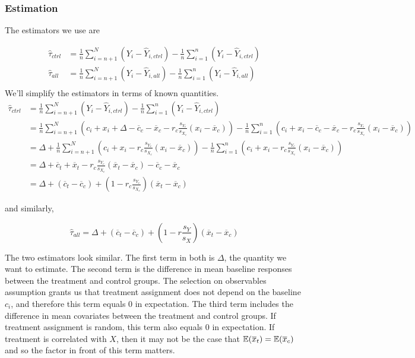 \subsubsection{Estimation}
The estimators we use are

\begin{align*}
\hat{\tau}_{ctrl} &= \frac{1}{n}\sum_{i = n+1}^N (Y_i - \hat{Y}_{i, ctrl}) - \frac{1}{n}\sum_{i=1}^n (Y_i - \hat{Y}_{i, ctrl} ) \nonumber \\
\hat{\tau}_{all} &= \frac{1}{n}\sum_{i = n+1}^N (Y_i - \hat{Y}_{i, all}) - \frac{1}{n}\sum_{i=1}^n (Y_i - \hat{Y}_{i, all} ) \nonumber \\
\end{align*}
We'll simplify the estimators in terms of known quantities.
\begin{align}
\hat{\tau}_{ctrl} &= \frac{1}{n}\sum_{i = n+1}^N (Y_i - \hat{Y}_{i, ctrl}) - \frac{1}{n}\sum_{i=1}^n (Y_i - \hat{Y}_{i, ctrl} ) \nonumber \\
&=  \frac{1}{n}\sum_{i = n+1}^N (c_i + x_i + \Delta - \overline{c}_c - \overline{x}_c - r_c \frac{s_{Y_c}}{s_{X_c}}(x_i - \overline{x}_c)) - \frac{1}{n}\sum_{i=1}^n (c_i + x_i - \overline{c}_c - \overline{x}_c - r_c \frac{s_{Y_c}}{s_{X_c}}(x_i - \overline{x}_c))  \nonumber \\
&= \Delta+  \frac{1}{n}\sum_{i = n+1}^N (c_i + x_i - r_c \frac{s_{Y_c}}{s_{X_c}}(x_i - \overline{x}_c)) - \frac{1}{n}\sum_{i=1}^n (c_i + x_i - r_c \frac{s_{Y_c}}{s_{X_c}}(x_i - \overline{x}_c))  \nonumber \\
&= \Delta + \overline{c}_t + \overline{x}_t - r_c \frac{s_{Y_c}}{s_{X_c}}(\overline{x}_t - \overline{x}_c) - \overline{c}_c - \overline{x}_c  \nonumber \\
&= \Delta + (\overline{c}_t - \overline{c}_c) + (1 - r_c \frac{s_{Y_c}}{s_{X_c}})(\overline{x}_t - \overline{x}_c)
\end{align}

\noindent and similarly,

\begin{equation}
\hat{\tau}_{all} = \Delta + (\overline{c}_t - \overline{c}_c) + (1 - r\frac{s_{Y}}{s_{X}})(\overline{x}_t - \overline{x}_c)
\end{equation}

The two estimators look similar.  The first term in both is $\Delta$, the quantity we want to estimate.  The second term is the difference in mean baseline responses between the treatment and control groups.  The selection on observables assumption grants us that treatment assignment does not depend on the baseline $c_i$, and therefore this term equals $0$ in expectation.  The third term includes the difference in mean covariates between the treatment and control groups.  If treatment assignment is random, this term also equals $0$ in expectation.  If treatment is correlated with $X$, then it may not be the case that $\mathbb{E}(\overline{x}_t) = \mathbb{E}(\overline{x}_c)$ and so the factor in front of this term matters. 

